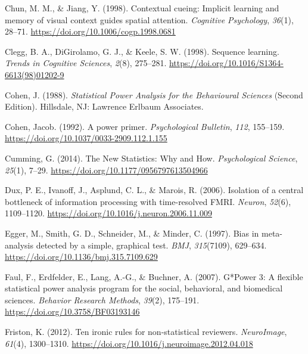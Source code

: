 \documentclass[
  man]{apa6}
\newlength{\cslhangindent}
\newlength{\cslentryspacingunit} %
\newenvironment{CSLReferences}[2] %
 {%
  \setlength{\parindent}{0pt}
  \ifodd #1
  \let\oldpar\par
  \def\par{\hangindent=\cslhangindent\oldpar}
  \fi
  \setlength{\parskip}{#2\cslentryspacingunit}
 }%
 {}
\begin{document}
\begin{CSLReferences}{1}{0}
\leavevmode{}%
Chun, M. M., \& Jiang, Y. (1998). Contextual cueing: {Implicit} learning and memory of visual context guides spatial attention. \emph{Cognitive Psychology}, \emph{36}(1), 28--71. \url{https://doi.org/10.1006/cogp.1998.0681}

\leavevmode{}%
Clegg, B. A., DiGirolamo, G. J., \& Keele, S. W. (1998). Sequence learning. \emph{Trends in Cognitive Sciences}, \emph{2}(8), 275--281. \url{https://doi.org/10.1016/S1364-6613(98)01202-9}

\leavevmode{}%
Cohen, J. (1988). \emph{Statistical {Power Analysis} for the {Behavioural Sciences}} (Second Edition). {Hillsdale, NJ}: {Lawrence Erlbaum Associates}.

\leavevmode{}%
Cohen, Jacob. (1992). A power primer. \emph{Psychological Bulletin}, \emph{112}, 155--159. \url{https://doi.org/10.1037/0033-2909.112.1.155}

\leavevmode{}%
Cumming, G. (2014). The {New Statistics}: {Why} and {How}. \emph{Psychological Science}, \emph{25}(1), 7--29. \url{https://doi.org/10.1177/0956797613504966}

\leavevmode{}%
Dux, P. E., Ivanoff, J., Asplund, C. L., \& Marois, R. (2006). Isolation of a central bottleneck of information processing with time-resolved {FMRI}. \emph{Neuron}, \emph{52}(6), 1109--1120. \url{https://doi.org/10.1016/j.neuron.2006.11.009}

\leavevmode{}%
Egger, M., Smith, G. D., Schneider, M., \& Minder, C. (1997). Bias in meta-analysis detected by a simple, graphical test. \emph{BMJ}, \emph{315}(7109), 629--634. \url{https://doi.org/10.1136/bmj.315.7109.629}

\leavevmode{}%
Faul, F., Erdfelder, E., Lang, A.-G., \& Buchner, A. (2007). G*{Power} 3: {A} flexible statistical power analysis program for the social, behavioral, and biomedical sciences. \emph{Behavior Research Methods}, \emph{39}(2), 175--191. \url{https://doi.org/10.3758/BF03193146}

\leavevmode{}%
Friston, K. (2012). Ten ironic rules for non-statistical reviewers. \emph{NeuroImage}, \emph{61}(4), 1300--1310. \url{https://doi.org/10.1016/j.neuroimage.2012.04.018}


\end{CSLReferences}
\end{document}
